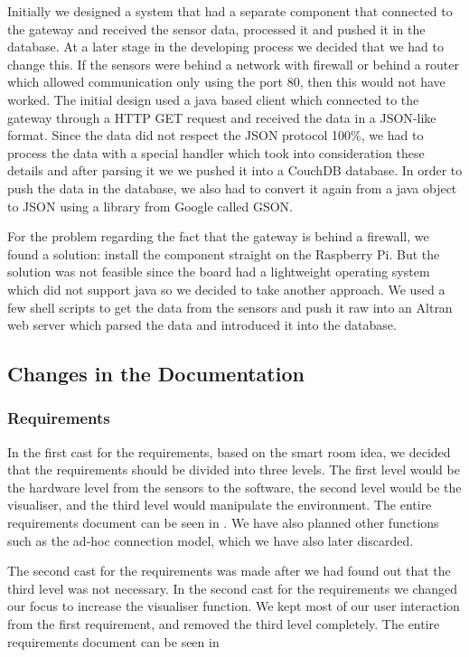 \documentclass[../document.tex]{subfiles}
\begin{document}
Initially we designed a system that had a separate component that connected to the gateway and received the sensor data, processed it and pushed it in the database. At a later stage in the developing process we decided that we had to change this. If the sensors were behind a network with firewall or behind a router which allowed communication only using the port 80, then this would not have worked. The initial design used a java based client which connected to the gateway through a HTTP GET request and received the data in a \gls{JSON}-like format. Since the data did not respect the \gls{JSON} protocol 100\%, we had to process the data with a special handler which took into consideration these details and after parsing it we we pushed it into a CouchDB database. In order to push the data in the database, we also had to convert it again from a java object to \gls{JSON} using a library from Google called GSON. 

For the problem regarding the fact that the gateway is behind a firewall, we found a solution: install the component straight on the Raspberry Pi. But the solution was not feasible since the board had a lightweight operating system which did not support java so we decided to take another approach. We used a few shell scripts to get the data from the sensors and push it raw into an Altran web server which parsed the data and introduced it into the database.

\subsection{Changes in the Documentation}

\subsubsection{Requirements}
In the first cast for the requirements, based on the smart room idea, we decided that the requirements should be divided into three levels. The first level would be the hardware level from the sensors to the software, the second level would be the visualiser, and the third level would manipulate the environment. The entire requirements document can be seen in . We have also planned other functions such as the ad-hoc connection model, which we have also later discarded. 

The second cast for the requirements was made after we had found out that the third level was not necessary. In the second cast for the requirements we changed our focus to increase the visualiser function. We kept most of our user interaction from the first requirement, and removed the third level completely. The entire requirements document can be seen in 
\end{document}
